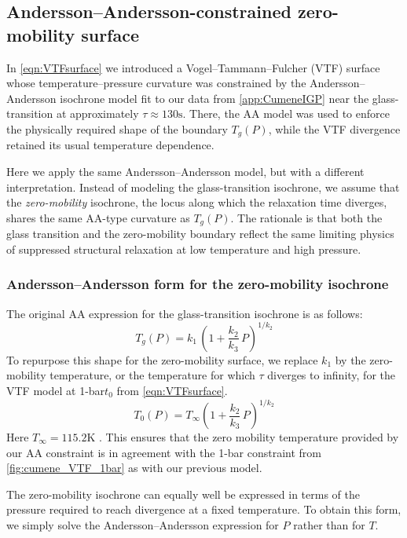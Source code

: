 \subsection{Andersson--Andersson-constrained zero-mobility surface}

In \eqn \ref{eqn:VTFsurface} we introduced a Vogel--Tammann--Fulcher
(VTF) surface whose temperature--pressure curvature was constrained by
the Andersson--Andersson isochrone model fit to our \tgp data from \app \ref{app:CumeneIGP} near the glass-transition at approximately $\tau\approx 130\si{\second}$.
There, the AA model was used to enforce the physically required shape
of the boundary $T_{g}(P)$, while the VTF divergence retained its
usual temperature dependence.

Here we apply the same Andersson--Andersson model, but with a different
interpretation. Instead of modeling the glass-transition isochrone, we
assume that the \emph{zero-mobility} isochrone, the locus along which
the relaxation time diverges, shares the same AA-type curvature as
$T_{g}(P)$. The rationale is that both the glass transition and the
zero-mobility boundary reflect the same limiting physics of suppressed
structural relaxation at low temperature and high pressure.

\subsubsection*{Andersson--Andersson form for the zero-mobility isochrone}

The original AA expression for the glass-transition isochrone is as follows:
\begin{equation}
	T_{g}(P)
	= k_{1}\,\left(1 + \frac{k_{2}}{k_{3}}\,P\right)^{1/k_{2}}
	\label{eqn:AA_original}
\end{equation}
To repurpose this shape for the zero-mobility surface, we replace
$k_{1}$ by the zero-mobility temperature, or the temperature for which $\tau$ diverges to infinity, for the VTF model at 1-bar\textemdash $t_0$ from \eqn \ref{eqn:VTFsurface}.
\begin{equation}
	T_{0}(P)
	= T_{\infty}
	\left(1 + \frac{k_{2}}{k_{3}}\,P\right)^{1/k_{2}}
	\label{eqn:T0_of_P}
\end{equation}
Here $T_{\infty}=115.2\si{\kelvin}$ .  This  ensures that the zero mobility temperature provided by our AA constraint is in agreement with the 1-bar constraint from \fig  \ref{fig:cumene_VTF_1bar} as with our previous model.

The zero-mobility isochrone can equally well be expressed in terms of
the pressure required to reach divergence at a fixed temperature.  
To obtain this form, we simply solve the Andersson--Andersson expression
for $P$ rather than for $T$. 


